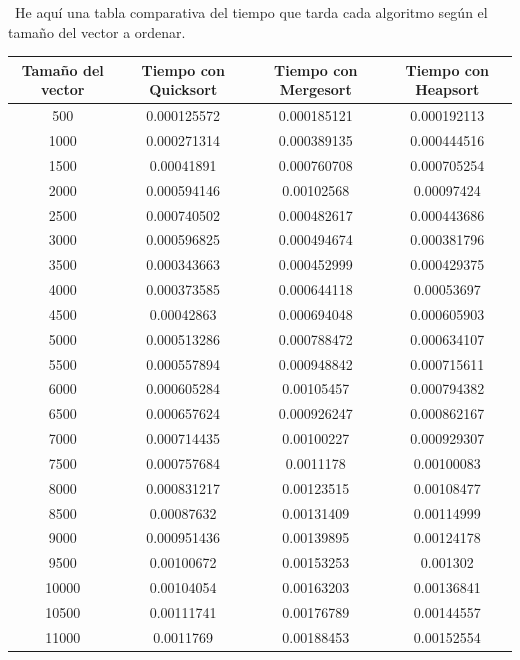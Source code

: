 \documentclass{article}
\begin{document}
	\
	He aquí una tabla comparativa del tiempo que tarda cada algoritmo según el tamaño del vector a ordenar.
		\begin{longtable}{|c|c|c|c|}
			\hline
			Tamaño del vector & Tiempo con Quicksort & Tiempo con Mergesort & Tiempo con Heapsort \\ \hline
			500	     &  0.000125572	 &  0.000185121	 &  0.000192113  \\ \hline
			1000	 &  0.000271314	 &  0.000389135	 &  0.000444516  \\ \hline
			1500	 &  0.00041891	 &  0.000760708	 &  0.000705254  \\ \hline
			2000	 &  0.000594146	 &  0.00102568	 &  0.00097424  \\ \hline
			2500	 &  0.000740502	 &  0.000482617	 &  0.000443686  \\ \hline
			3000	 &  0.000596825	 &  0.000494674	 &  0.000381796  \\ \hline
			3500	 &  0.000343663	 &  0.000452999	 &  0.000429375  \\ \hline
			4000	 &  0.000373585	 &  0.000644118	 &  0.00053697  \\ \hline
			4500	 &  0.00042863	 &  0.000694048	 &  0.000605903  \\ \hline
			5000	 &  0.000513286	 &  0.000788472	 &  0.000634107  \\ \hline
			5500	 &  0.000557894	 &  0.000948842	 &  0.000715611  \\ \hline
			6000	 &  0.000605284	 &  0.00105457	 &  0.000794382  \\ \hline
			6500	 &  0.000657624	 &  0.000926247	 &  0.000862167  \\ \hline
			7000	 &  0.000714435	 &  0.00100227	 &  0.000929307  \\ \hline
			7500	 &  0.000757684	 &  0.0011178	 &  0.00100083  \\ \hline
			8000	 &  0.000831217	 &  0.00123515	 &  0.00108477  \\ \hline
			8500	 &  0.00087632	 &  0.00131409	 &  0.00114999  \\ \hline
			9000	 &  0.000951436	 &  0.00139895	 &  0.00124178  \\ \hline
			9500	 &  0.00100672	 &  0.00153253	 &  0.001302  \\ \hline
			10000	 &  0.00104054	 &  0.00163203	 &  0.00136841  \\ \hline
			10500	 &  0.00111741	 &  0.00176789	 &  0.00144557  \\ \hline
			11000	 &  0.0011769	 &  0.00188453	 &  0.00152554  \\ \hline

\end{longtable}
\end{document}
